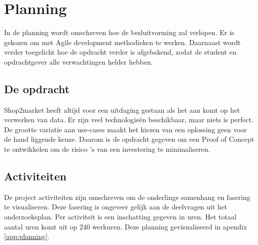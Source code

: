 \chapter{Planning} %

In de planning wordt omschreven hoe de besluitvorming zal verlopen. Er is gekozen om met Agile development methodieken te werken. Daarnaast wordt verder toegelicht hoe de opdracht verder is afgebakend, zodat de student en opdrachtgever alle verwachtingen helder hebben. 

\section{De opdracht} %

Shop2market heeft altijd voor een uitdaging gestaan als het aan komt op het verwerken van data. Er zijn veel technologieën beschikbaar, maar niets is perfect. De grootte variatie aan use-cases maakt het kiezen van een oplossing geen voor de hand liggende keuze.
Daarom is de opdracht gegeven om een Proof of Concept te ontwikkelen om de risico 's van een investering te minimaliseren.


\section{Activiteiten}
\label{sec:activiteiten}
De project activiteiten zijn omschreven om de onderlinge samenhang en fasering te visualiseren. Deze fasering is ongeveer gelijk aan de deelvragen uit het onderzoeksplan. Per activiteit is een inschatting gegeven in uren. Het totaal aantal uren komt uit op 240 werkuren. Deze planning gevisualiseerd in apendix \ref{app:planning}.


